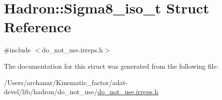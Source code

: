 \hypertarget{structHadron_1_1Sigma8__iso__t}{}\section{Hadron\+:\+:Sigma8\+\_\+iso\+\_\+t Struct Reference}
\label{structHadron_1_1Sigma8__iso__t}


{\ttfamily \#include $<$do\+\_\+not\+\_\+use.\+irreps.\+h$>$}



The documentation for this struct was generated from the following file\+:\begin{DoxyCompactItemize}
\item 
/\+Users/archanar/\+Kinematic\+\_\+factor/adat-\/devel/lib/hadron/do\+\_\+not\+\_\+use/\mbox{\hyperlink{adat-devel_2lib_2hadron_2do__not__use_2do__not__use_8irreps_8h}{do\+\_\+not\+\_\+use.\+irreps.\+h}}\end{DoxyCompactItemize}
